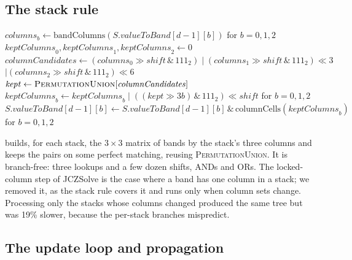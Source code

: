 \documentclass[11pt]{article}
\theoremstyle{definition}
\theoremstyle{plain}
\let\origtextsc\textsc
\renewcommand{\textsc}[1]{\textup{\origtextsc{#1}}}
\begin{document}
\subsection{The stack rule}

\begin{algorithm}[H]
\caption{\textsc{StackRule}$(S, d)$}
\label{alg:stack}
\begin{algorithmic}[1]
\State $\mathit{columns}_b \gets \mathrm{bandColumns}(S.\mathit{valueToBand}[d-1][b])$ for $b = 0,1,2$ 
\State $\mathit{keptColumns}_0, \mathit{keptColumns}_1, \mathit{keptColumns}_2 \gets 0$
 
  \State $\mathit{columnCandidates} \gets (\mathit{columns}_0\gg \mathit{shift} \,\&\, 111_2) \mid (\mathit{columns}_1\gg \mathit{shift} \,\&\, 111_2)\ll 3$
  \Statex \hspace{\algorithmicindent}\hspace{\algorithmicindent}$\mid (\mathit{columns}_2\gg \mathit{shift} \,\&\, 111_2)\ll 6$ 
  \State $\mathit{kept} \gets \textsc{PermutationUnion}[\mathit{columnCandidates}]$
  \State $\mathit{keptColumns}_b \gets \mathit{keptColumns}_b \mid ((\mathit{kept} \gg 3b)\,\&\,111_2)\ll \mathit{shift}$ for $b = 0,1,2$
\EndFor
\State $S.\mathit{valueToBand}[d-1][b] \gets S.\mathit{valueToBand}[d-1][b] \,\&\, \mathrm{columnCells}(\mathit{keptColumns}_b)$ for $b = 0,1,2$
\end{algorithmic}
\end{algorithm}


 builds, for each stack, the $3\times 3$ matrix of bands by the stack's three columns and keeps the
pairs on some perfect matching, reusing \textsc{PermutationUnion}. It is branch-free: three lookups and a few dozen shifts,
ANDs and ORs. The locked-column step of JCZSolve is the case where a band has one column
in a stack; we removed it, as the stack rule covers it and runs only when column sets change. Processing only the
stacks whose columns changed produced the same tree but was 19\% slower, because the per-stack branches mispredict.

\subsection{The update loop and propagation}
\end{document}
